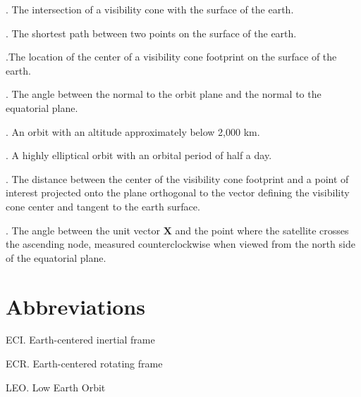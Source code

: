 \documentclass[oneside,12pt]{report}
\begin{document}
\vspace{8pt} . The intersection of a visibility cone with the surface of the earth.

\vspace{8pt} . The shortest path between two points on the surface of the earth. 

\vspace{8pt} .The location of the center of a visibility cone footprint on the surface of the earth.

\vspace{8pt}
.  The angle between the normal to the orbit plane
and the normal to the equatorial plane.

\vspace{8pt} . An orbit with an altitude approximately below 2,000 km.

\vspace{8pt} . A highly elliptical orbit with an orbital period of half a day.

\vspace{8pt} . The distance between the center of the visibility cone footprint and a point of interest projected onto the plane orthogonal to the vector defining the visibility cone center and tangent to the earth surface.

\vspace{8pt}
. The angle
between the unit vector $\bm{X}$ and the point where the satellite crosses the
ascending node, measured counterclockwise when viewed from the north side of
the equatorial plane.


\chapter{Abbreviations}\label{Abbreviations}


\noindent ECI.  Earth-centered inertial frame

\vspace{5pt}

\noindent ECR.  Earth-centered rotating frame

\vspace{5pt}

\noindent LEO.  Low Earth Orbit  

\vspace{5pt}
\end{document}
